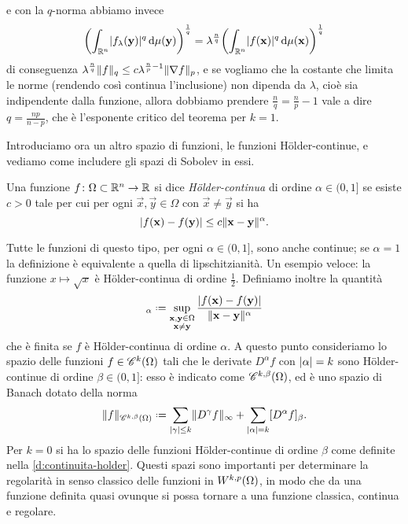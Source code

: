 e con la $q$-norma abbiamo invece
\begin{equation}
    \biggl(\int_{\R^n}\abs{f_\lambda(\vec y)}^q\,\dd\mu(\vec y)\biggr)^\frac1{q}=
    \lambda^\frac{n}{q}\biggl(\int_{\R^n}\abs{f(\vec x)}^q\,\dd\mu(\vec x)\biggr)^\frac1{q}
\end{equation}
di conseguenza $\lambda^\frac{n}{q}\norm{f}_q\le c\lambda^{\frac{n}{p}-1}\norm{\grad f}_p$, e se vogliamo che la costante che limita le norme (rendendo cos\`i continua l'inclusione) non dipenda da $\lambda$, cioè sia indipendente dalla funzione, allora dobbiamo prendere $\frac{n}{q}=\frac{n}{p}-1$ vale a dire $q=\frac{np}{n-p}$, che è l'esponente critico del teorema per $k=1$.

Introduciamo ora un altro spazio di funzioni, le funzioni Hölder-continue, e vediamo come includere gli spazi di Sobolev in essi.
\begin{definizione} \label{d:continuita-holder}
    Una funzione $f\colon\Omega\subset\R^n\to\R$ si dice \emph{Hölder-continua} di ordine $\alpha\in(0,1]$ se esiste $c>0$ tale per cui per ogni $\vec x,\vec y\in\Omega$  con $\vec x\ne\vec y$ si ha
    \begin{equation}
        \abs{f(\vec x)-f(\vec y)}\le c\norm{\vec x-\vec y}^\alpha.
    \end{equation}
\end{definizione}
Tutte le funzioni di questo tipo, per ogni $\alpha\in(0,1]$, sono anche continue; se $\alpha=1$ la definizione è equivalente a quella di lipschitzianità.
Un esempio veloce: la funzione $x\mapsto\sqrt{x}$ è Hölder-continua di ordine $\frac12$.
Definiamo inoltre la quantità
\begin{equation}
    [f]_\alpha\defeq\sup_{\substack{\vec x,\vec y\in\Omega\\\vec x\ne\vec y}}\frac{\abs{f(\vec x)-f(\vec y)}}{\norm{\vec x-\vec y}^\alpha}
    \label{eq:seminorma-holder}
\end{equation}
che è finita se $f$ è Hölder-continua di ordine $\alpha$.
A questo punto consideriamo lo spazio delle funzioni $f\in\cont[k]{\Omega}$ tali che le derivate $D^\alpha f$ con $\abs{\alpha}=k$ sono Hölder-continue di ordine $\beta\in(0,1]$: esso è indicato come $\cont[k,\beta]{\Omega}$, ed è uno spazio di Banach dotato della norma
\begin{equation}
    \norm{f}_{\cont[k,\beta]{\Omega}}\defeq\sum_{\abs{\gamma}\le k}\norm{D^\gamma f}_\infty+\sum_{\abs{\alpha}=k}[D^\alpha f]_\beta.
    \label{eq:norma-spazio-holder}
\end{equation}
Per $k=0$ si ha lo spazio delle funzioni Hölder-continue di ordine $\beta$ come definite nella \ref{d:continuita-holder}.
Questi spazi sono importanti per determinare la regolarità in senso classico delle funzioni in $\sobW[k,p]{\Omega}$, in modo che da una funzione definita quasi ovunque si possa tornare a una funzione classica, continua e regolare.

